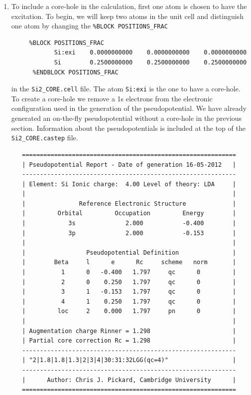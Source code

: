 \documentclass[a4paper,11pt,twoside]{book}
\begin{document}
{\begin{enumerate}
\item To include a core-hole in the calculation, first one atom is chosen to have the excitation.  To begin, we will keep two atoms in the unit cell and distinguish one atom by changing the \verb#%BLOCK POSITIONS_FRAC#
\begin{verbatim} 
     %BLOCK POSITIONS_FRAC
            Si:exi    0.0000000000    0.0000000000    0.0000000000
            Si        0.2500000000    0.2500000000    0.2500000000
      %ENDBLOCK POSITIONS_FRAC
\end{verbatim}
in the \verb#Si2_CORE.cell# file.  The atom \verb#Si:exi# is the one to have a core-hole.  To create a core-hole we remove a 1s electrons from the electronic configuration used in the generation of the pseudopotential.  We have already generated an on-the-fly pseudopotential without a core-hole in the previous section.  Information about the pseudopotentials is included at the top of the \verb#Si2_CORE.castep# file.  

\begin{verbatim}
   ============================================================                
   | Pseudopotential Report - Date of generation 16-05-2012   |                
   ------------------------------------------------------------                
   | Element: Si Ionic charge:  4.00 Level of theory: LDA     |                
   |                                                          |                
   |               Reference Electronic Structure             |                
   |         Orbital         Occupation         Energy        |                
   |            3s              2.000           -0.400        |                
   |            3p              2.000           -0.153        |                
   |                                                          |                
   |                 Pseudopotential Definition               |                
   |        Beta     l      e      Rc     scheme   norm       |                
   |          1      0   -0.400   1.797     qc      0         |                
   |          2      0    0.250   1.797     qc      0         |                
   |          3      1   -0.153   1.797     qc      0         |                
   |          4      1    0.250   1.797     qc      0         |                
   |         loc     2    0.000   1.797     pn      0         |                
   |                                                          |                
   | Augmentation charge Rinner = 1.298                       |                
   | Partial core correction Rc = 1.298                       |                
   ------------------------------------------------------------                
   | "2|1.8|1.8|1.3|2|3|4|30:31:32LGG(qc=4)"                  |                
   ------------------------------------------------------------                
   |      Author: Chris J. Pickard, Cambridge University      |                
   ============================================================      
\end{verbatim}


\end{enumerate}}
\end{document}
